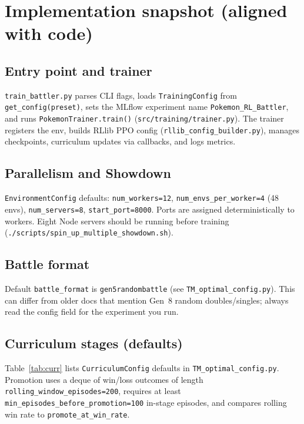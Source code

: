 \chapter{Implementation snapshot (aligned with code)}

\section{Entry point and trainer}
\texttt{train\_battler.py} parses CLI flags, loads \texttt{TrainingConfig} from \texttt{get\_config(preset)}, sets the MLflow experiment name \texttt{Pokemon\_RL\_Battler}, and runs \texttt{PokemonTrainer.train()} (\texttt{src/training/trainer.py}). The trainer registers the env, builds RLlib PPO config (\texttt{rllib\_config\_builder.py}), manages checkpoints, curriculum updates via callbacks, and logs metrics.

\section{Parallelism and Showdown}
\texttt{EnvironmentConfig} defaults: \texttt{num\_workers=12}, \texttt{num\_envs\_per\_worker=4} (48 envs), \texttt{num\_servers=8}, \texttt{start\_port=8000}. Ports are assigned deterministically to workers. Eight Node servers should be running before training (\texttt{./scripts/spin\_up\_multiple\_showdown.sh}).

\section{Battle format}
Default \texttt{battle\_format} is \texttt{gen5randombattle} (see \texttt{TM\_optimal\_config.py}). This can differ from older docs that mention Gen~8 random doubles/singles; always read the config field for the experiment you run.

\section{Curriculum stages (defaults)}
Table~\ref{tab:curr} lists \texttt{CurriculumConfig} defaults in \texttt{TM\_optimal\_config.py}. Promotion uses a deque of win/loss outcomes of length \texttt{rolling\_window\_episodes=200}, requires at least \texttt{min\_episodes\_before\_promotion=100} in-stage episodes, and compares rolling win rate to \texttt{promote\_at\_win\_rate}.

